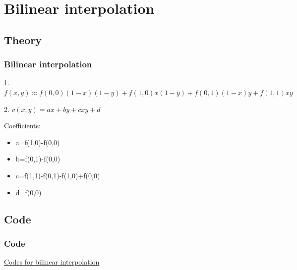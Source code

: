 \documentclass[notheorems,serif,table,compress]{beamer}  %
\begin{document}
\section{Bilinear interpolation}

\subsection*{Theory}
\begin{frame}
\frametitle{Bilinear interpolation}

1.$f(x,y) \approx f(0,0)(1-x)(1-y)+f(1,0)x(1-y)+f(0,1)(1-x)y+f(1,1)xy$

\mbox{}

2.
\begin{math}
v(x,y)=ax+by+cxy+d
\end{math}

\mbox{}

Coefficients:
\begin{itemize}
\item a=f(1,0)-f(0,0)
\item b=f(0,1)-f(0,0)
\item c=f(1,1)-f(0,1)-f(1,0)+f(0,0)
\item d=f(0,0)
\end{itemize}
\end{frame}

\subsection*{Code}
\begin{frame}
\frametitle{Code}
\href{code/bilinear.cpp}{Codes for bilinear interpolation}
\end{frame}
\end{document}

